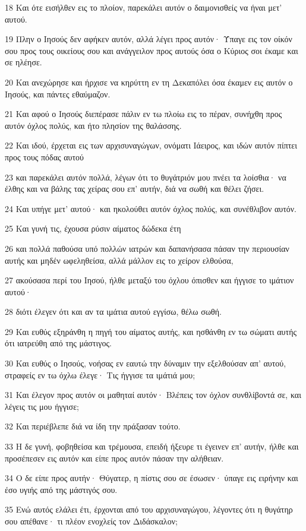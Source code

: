 \par 18 Και ότε εισήλθεν εις το πλοίον, παρεκάλει αυτόν ο δαιμονισθείς να ήναι μετ' αυτού.
\par 19 Πλην ο Ιησούς δεν αφήκεν αυτόν, αλλά λέγει προς αυτόν· Ύπαγε εις τον οίκόν σου προς τους οικείους σου και ανάγγειλον προς αυτούς όσα ο Κύριος σοι έκαμε και σε ηλέησε.
\par 20 Και ανεχώρησε και ήρχισε να κηρύττη εν τη Δεκαπόλει όσα έκαμεν εις αυτόν ο Ιησούς, και πάντες εθαύμαζον.
\par 21 Και αφού ο Ιησούς διεπέρασε πάλιν εν τω πλοίω εις το πέραν, συνήχθη προς αυτόν όχλος πολύς, και ήτο πλησίον της θαλάσσης.
\par 22 Και ιδού, έρχεται εις των αρχισυναγώγων, ονόματι Ιάειρος, και ιδών αυτόν πίπτει προς τους πόδας αυτού
\par 23 και παρεκάλει αυτόν πολλά, λέγων ότι το θυγάτριόν μου πνέει τα λοίσθια· να έλθης και να βάλης τας χείρας σου επ' αυτήν, διά να σωθή και θέλει ζήσει.
\par 24 Και υπήγε μετ' αυτού· και ηκολούθει αυτόν όχλος πολύς, και συνέθλιβον αυτόν.
\par 25 Και γυνή τις, έχουσα ρύσιν αίματος δώδεκα έτη
\par 26 και πολλά παθούσα υπό πολλών ιατρών και δαπανήσασα πάσαν την περιουσίαν αυτής και μηδέν ωφεληθείσα, αλλά μάλλον εις το χείρον ελθούσα,
\par 27 ακούσασα περί του Ιησού, ήλθε μεταξύ του όχλου όπισθεν και ήγγισε το ιμάτιον αυτού·
\par 28 διότι έλεγεν ότι και αν τα ιμάτια αυτού εγγίσω, θέλω σωθή.
\par 29 Και ευθύς εξηράνθη η πηγή του αίματος αυτής, και ησθάνθη εν τω σώματι αυτής ότι ιατρεύθη από της μάστιγος.
\par 30 Και ευθύς ο Ιησούς, νοήσας εν εαυτώ την δύναμιν την εξελθούσαν απ' αυτού, στραφείς εν τω όχλω έλεγε· Τις ήγγισε τα ιμάτιά μου;
\par 31 Και έλεγον προς αυτόν οι μαθηταί αυτόν· Βλέπεις τον όχλον συνθλίβοντά σε, και λέγεις τις μου ήγγισε;
\par 32 Και περιέβλεπε διά να ίδη την πράξασαν τούτο.
\par 33 Η δε γυνή, φοβηθείσα και τρέμουσα, επειδή ήξευρε τι έγεινεν επ' αυτήν, ήλθε και προσέπεσεν εις αυτόν και είπε προς αυτόν πάσαν την αλήθειαν.
\par 34 Ο δε είπε προς αυτήν· Θύγατερ, η πίστις σου σε έσωσεν· ύπαγε εις ειρήνην και έσο υγιής από της μάστιγός σου.
\par 35 Ενώ αυτός ελάλει έτι, έρχονται από του αρχισυναγώγου, λέγοντες ότι η θυγάτηρ σου απέθανε· τι πλέον ενοχλείς τον Διδάσκαλον;
